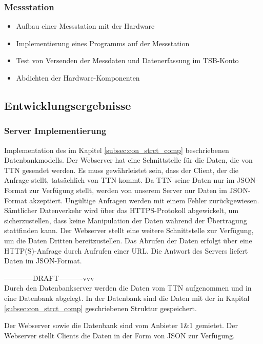 \subsubsection{Messstation}
\begin{itemize}
	\item Aufbau einer Messstation mit der Hardware
	\item Implementierung eines Programms auf der Messstation
	\item Test von Versenden der Messdaten und Datenerfassung im TSB-Konto
	\item Abdichten der Hardware-Komponenten
\end{itemize}

\subsection{Entwicklungsergebnisse}

\subsubsection{Server Implementierung}

Implementation des im Kapitel \ref{subsec:con_strct_comp} beschriebenen Datenbankmodells. Der Webserver hat eine Schnittstelle für die Daten, die von TTN gesendet werden.
Es muss gewährleistet sein, dass der Client, der die Anfrage stellt, tats\"achlich von TTN kommt. Da TTN seine Daten nur im JSON-Format zur Verf\"ugung stellt, werden von unserem
Server nur Daten im JSON-Format akzeptiert. Ung\"ultige Anfragen werden mit einem Fehler zurückgewiesen. Sämtlicher Datenverkehr wird \"uber das HTTPS-Protokoll abgewickelt, um
sicherzustellen, dass keine Manipulation der Daten w\"ahrend der \"Ubertragung stattfinden kann.
Der Webserver stellt eine weitere Schnittstelle zur Verf\"ugung, um die Daten Dritten bereitzustellen. Das Abrufen der Daten erfolgt \"uber eine HTTP(S)-Anfrage durch Aufrufen
einer URL. Die Antwort des Servers liefert Daten im JSON-Format.

------------DRAFT----------vvv\\
Durch den Datenbankserver werden die Daten vom TTN aufgenommen und in eine Datenbank abgelegt. In der Datenbank sind die Daten mit der in Kapital \ref{subsec:con_strct_comp} geschriebenen Struktur gespeichert.

Der Webserver sowie die Datenbank sind vom Anbieter 1\&1 gemietet. Der Webserver stellt Clients die Daten in der Form von JSON zur Verfügung.

